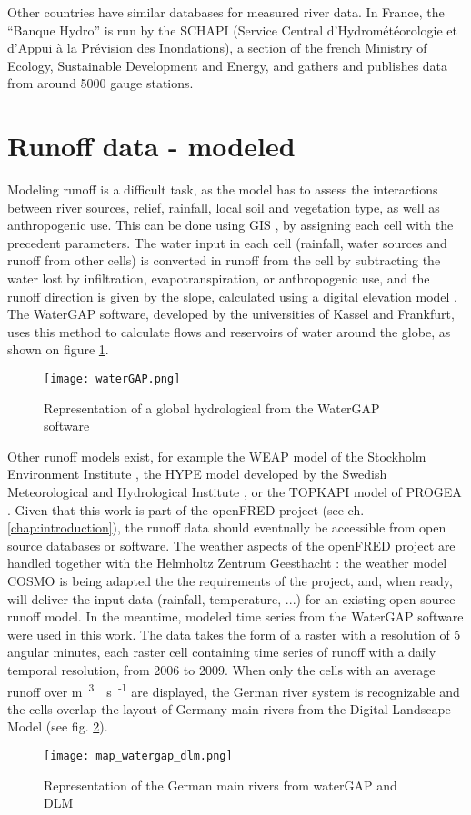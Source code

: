 Other countries have similar databases for measured river data. In France, the ``Banque Hydro'' is run by the SCHAPI (Service Central d'Hydrométéorologie et d'Appui à la Prévision des Inondations), a section of the french Ministry of Ecology, Sustainable Development and Energy, and gathers and publishes data from around 5000 gauge stations.

\section{Runoff data - modeled}

\label{sec:mod_runoff}
Modeling runoff is a difficult task, as the model has to assess the interactions between river sources, relief, rainfall, local soil and vegetation type, as well as anthropogenic use. This can be done using GIS \cite{bayazit}, by assigning each cell with the precedent parameters. The water input in each cell (rainfall, water sources and runoff from other cells) is converted in runoff from the cell by subtracting the water lost by infiltration, evapotranspiration, or anthropogenic use, and the runoff direction is given by the slope, calculated using a digital elevation model \cite{heywood}. \newline
The WaterGAP software, developed by the universities of Kassel and Frankfurt, uses this method to calculate flows and reservoirs of water around the globe, as shown on figure \ref{waterGAP}.
\begin{figure}[H]
\centering
\texttt{[image: waterGAP.png]}
\caption[Representation of a global hydrological from the WaterGAP software]{Representation of a global hydrological from the WaterGAP software \cite{doll}}
\label{waterGAP}
\end{figure}
Other runoff models exist, for example the WEAP model of the Stockholm Environment Institute \cite{weap}, the HYPE model developed by the Swedish Meteorological and Hydrological Institute \cite{hype}, or the TOPKAPI model of PROGEA \cite{topkapi}. \newline
Given that this work is part of the openFRED project (see ch. \ref{chap:introduction}), the runoff data should eventually be accessible from open source databases or software. The weather aspects of the openFRED project are handled together with the Helmholtz Zentrum Geesthacht : the weather model COSMO is being adapted the the requirements of the project, and, when ready, will deliver the input data (rainfall, temperature, ...) for an existing open source runoff model. \newline
In the meantime, modeled time series from the WaterGAP software were used in this work. The data takes the form of a raster with a resolution of 5 angular minutes, each raster cell containing time series of runoff with a daily temporal resolution, from 2006 to 2009. When only the cells with an average runoff over \unit[100]{m\textsuperscript{3}\textperiodcentered s\textsuperscript{-1}} are displayed, the German river system is recognizable and the cells overlap the layout of Germany main rivers from the Digital Landscape Model \cite{dlm250} (see fig. \ref{map_watergap_dlm}).

\begin{figure}[H]
\centering
\texttt{[image: map\_watergap\_dlm.png]}
\caption[Representation of the German main rivers from waterGAP and DLM]{Representation of the German main rivers from waterGAP and DLM}
\label{map_watergap_dlm}
\end{figure}

